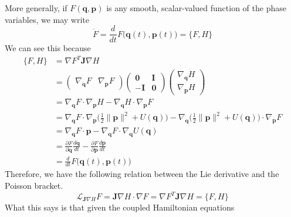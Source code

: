       More generally, if $F(\mathbf{q}, \mathbf{p})$ is any smooth, scalar-valued function of the phase variables, we may write 
      \begin{equation}
        \dot{F} = \frac{d}{dt} F \big( \mathbf{q}(t), \mathbf{p}(t)\big) = \{F, H\}
      \end{equation}
      We can see this because 
      \begin{align*}
        \{F, H\} & = \nabla F^T \mathbf{J} \nabla H \\
        & = \begin{pmatrix}
        \nabla_\mathbf{q} F & \nabla_\mathbf{p} F 
        \end{pmatrix} \begin{pmatrix}
         \mathbf{0} & \mathbf{I} \\ -\mathbf{I} & \mathbf{0} 
        \end{pmatrix} \begin{pmatrix}
        \nabla_\mathbf{q} H \\ \nabla_\mathbf{p} H
        \end{pmatrix} \\
        & = \nabla_\mathbf{q} F \cdot \nabla_\mathbf{p} H - \nabla_\mathbf{q} H \cdot \nabla_\mathbf{p} F \\
        & = \nabla_\mathbf{q} F \cdot \nabla_\mathbf{p} \bigg( \frac{1}{2} \|\mathbf{p}\|^2 + U(\mathbf{q}) \bigg) - \nabla_\mathbf{q} \bigg( \frac{1}{2} \|\mathbf{p}\|^2 + U(\mathbf{q}) \bigg)  \cdot \nabla_\mathbf{p} F \\
        & = \nabla_\mathbf{q} F \cdot \mathbf{p} - \nabla_\mathbf{q} F \cdot \nabla_\mathbf{q} U(\mathbf{q}) \\
        & = \frac{\partial F}{\partial \mathbf{q}} \frac{ d \mathbf{q}}{d t} - \frac{\partial F}{\partial \mathbf{p}} \frac{d \mathbf{p}}{d t} \\
        & = \frac{d}{d t} F \big( \mathbf{q}(t), \mathbf{p}(t) \big) 
      \end{align*}
      Therefore, we have the following relation between the Lie derivative and the Poisson bracket. 
      \begin{equation}
        \mathcal{L}_{\mathbf{J} \nabla H} F = \mathbf{J} \nabla H \cdot \nabla F = \nabla F^T \mathbf{J} \nabla H = \{F, H\}
      \end{equation}
      What this says is that given the coupled Hamiltonian equations
